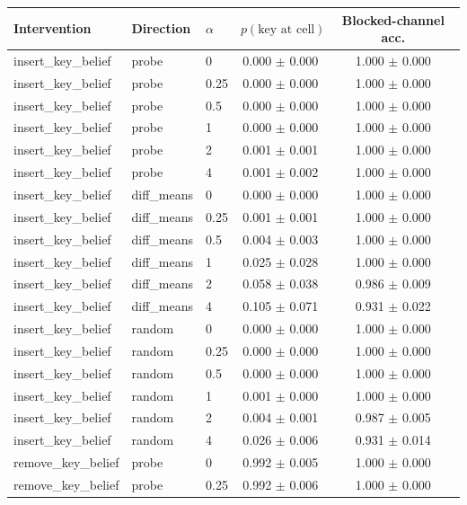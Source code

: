 
\begin{tabular}{lllcc}
\toprule
Intervention & Direction & $\alpha$ & $p(\text{key at cell})$ & Blocked-channel acc. \\
\midrule
insert\_key\_belief & probe & 0 & 0.000 $\pm$ 0.000 & 1.000 $\pm$ 0.000 \\
insert\_key\_belief & probe & 0.25 & 0.000 $\pm$ 0.000 & 1.000 $\pm$ 0.000 \\
insert\_key\_belief & probe & 0.5 & 0.000 $\pm$ 0.000 & 1.000 $\pm$ 0.000 \\
insert\_key\_belief & probe & 1 & 0.000 $\pm$ 0.000 & 1.000 $\pm$ 0.000 \\
insert\_key\_belief & probe & 2 & 0.001 $\pm$ 0.001 & 1.000 $\pm$ 0.000 \\
insert\_key\_belief & probe & 4 & 0.001 $\pm$ 0.002 & 1.000 $\pm$ 0.000 \\
insert\_key\_belief & diff\_means & 0 & 0.000 $\pm$ 0.000 & 1.000 $\pm$ 0.000 \\
insert\_key\_belief & diff\_means & 0.25 & 0.001 $\pm$ 0.001 & 1.000 $\pm$ 0.000 \\
insert\_key\_belief & diff\_means & 0.5 & 0.004 $\pm$ 0.003 & 1.000 $\pm$ 0.000 \\
insert\_key\_belief & diff\_means & 1 & 0.025 $\pm$ 0.028 & 1.000 $\pm$ 0.000 \\
insert\_key\_belief & diff\_means & 2 & 0.058 $\pm$ 0.038 & 0.986 $\pm$ 0.009 \\
insert\_key\_belief & diff\_means & 4 & 0.105 $\pm$ 0.071 & 0.931 $\pm$ 0.022 \\
insert\_key\_belief & random & 0 & 0.000 $\pm$ 0.000 & 1.000 $\pm$ 0.000 \\
insert\_key\_belief & random & 0.25 & 0.000 $\pm$ 0.000 & 1.000 $\pm$ 0.000 \\
insert\_key\_belief & random & 0.5 & 0.000 $\pm$ 0.000 & 1.000 $\pm$ 0.000 \\
insert\_key\_belief & random & 1 & 0.001 $\pm$ 0.000 & 1.000 $\pm$ 0.000 \\
insert\_key\_belief & random & 2 & 0.004 $\pm$ 0.001 & 0.987 $\pm$ 0.005 \\
insert\_key\_belief & random & 4 & 0.026 $\pm$ 0.006 & 0.931 $\pm$ 0.014 \\
\midrule
remove\_key\_belief & probe & 0 & 0.992 $\pm$ 0.005 & 1.000 $\pm$ 0.000 \\
remove\_key\_belief & probe & 0.25 & 0.992 $\pm$ 0.006 & 1.000 $\pm$ 0.000 \\

\end{tabular}
